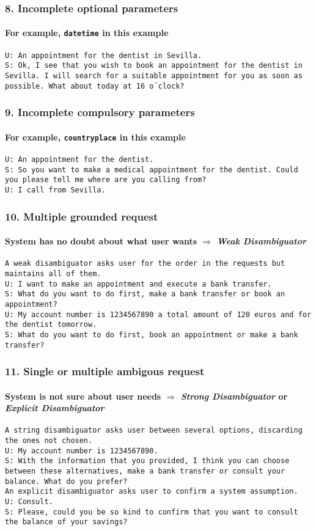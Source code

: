 \documentclass[11pt]{beamer}
\newcommand{\system}[1]{{\color{red}\texttt{S: #1}}\\}
\newcommand{\user}[1]{{\color{teal}\texttt{U: #1}}\\}
\newcommand{\comment}[1]{{\color{orange}\texttt{#1}}\\}
\begin{document}
\begin{frame}
\frametitle{8. Incomplete optional parameters}
\framesubtitle{For example, \texttt{datetime} in this example}
\user{An appointment for the dentist in Sevilla.}
\system{Ok, I see that you wish to book an appointment for the dentist in Sevilla. I will search for a suitable appointment for you as soon as possible. What about today at 16 o´clock?}
\end{frame}

\begin{frame}
\frametitle{9. Incomplete compulsory parameters}
\framesubtitle{For example, \texttt{countryplace} in this example}
\user{An appointment for the dentist.}
\system{So you want to make a medical appointment for the dentist. Could you please tell me where are you calling from?}
\user{I call from Sevilla.}
\end{frame}

\begin{frame}
\frametitle{10. Multiple grounded request}
\framesubtitle{System has no doubt about what user wants $\Rightarrow$ \emph{Weak Disambiguator}}
\comment{A weak disambiguator asks user for the order in the requests but maintains all of them.}
\vspace{10pt}
\user{I want to make an appointment and execute a bank transfer.}
\system{What do you want to do first, make a bank transfer or book an appointment?}
\vspace{10pt}
\user{My account number is 1234567890 a total amount of 120 euros and for the dentist tomorrow.}
\system{What do you want to do first, book an appointment or make a bank transfer?}
\end{frame}

\begin{frame}
\frametitle{11. Single or multiple ambigous request}
\framesubtitle{System is not sure about user needs $\Rightarrow$ \emph{Strong Disambiguator} or \emph{Explicit Disambiguator}}
\comment{A string disambiguator asks user between several options, discarding the ones not chosen.}
\vspace{10pt}
\user{My account number is 1234567890.}
\system{With the information that you provided, I think you can choose between these alternatives, make a bank transfer or consult your balance. What do you prefer?}
\vspace{10pt}
\comment{An explicit disambiguator asks user to confirm a system assumption.}
\vspace{10pt}
\user{Consult.}
\system{Please, could you be so kind to confirm that you want to consult the balance of your savings?}
\end{frame}
\end{document}
